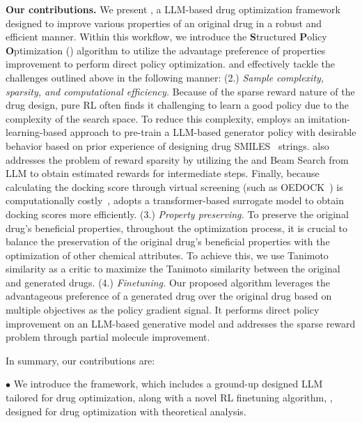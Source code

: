 \textbf{Our contributions.} {We present \fwname, a {LLM-based} drug optimization framework designed to improve various properties of an original drug in a robust and efficient manner. Within this workflow, we introduce the \textbf{S}tructured \textbf{P}olicy \textbf{O}ptimization (\textbf{\algname}) algorithm to utilize the advantage preference {of properties improvement} to perform direct policy {optimization}.
\fwname and \algname effectively tackle the challenges outlined above in the following manner:}
{(2.) \emph{Sample complexity, sparsity, and computational efficiency.}
Because of the sparse reward nature of the drug design,
pure RL often finds it challenging to learn a good policy due to the complexity of the search space.
To reduce this complexity, \algname employs an imitation-learning-based approach to {pre-train a LLM-based} generator policy {with desirable}
behavior based on prior experience {of} {designing}
drug SMILES~\citep{weininger1988smiles} {strings}.
\algname also addresses the problem of reward sparsity by {utilizing the \TOPK and \TOPP Beam Search from LLM}
to obtain estimated rewards for intermediate steps. Finally, because calculating the docking score through virtual screening ({such as} OEDOCK~\citep{kelley2015posit}) is computationally costly~\citep{clyde2023ai}, \fwname adopts a transformer-based surrogate model to obtain docking scores more efficiently.
(3.) \emph{Property preserving.} 
To preserve the original drug's beneficial properties,
throughout the optimization process, it is crucial to balance the preservation of the original drug's beneficial properties with the optimization of other chemical attributes. To achieve this, we use Tanimoto similarity as a critic to {maximize} the Tanimoto similarity between the original and generated drugs.
(4.) \emph{Finetuning.}
Our proposed \algname algorithm leverages the advantageous preference of a generated drug over the original drug based on multiple objectives as the policy gradient signal. It performs direct policy improvement on an LLM-based generative model and addresses the sparse reward problem through partial molecule improvement.
}



In summary, our contributions are:



$\bullet$ We introduce the \fwname framework, which includes a ground-up designed LLM tailored for drug optimization, along with a novel RL finetuning algorithm, \algname, designed for drug optimization with theoretical analysis.








